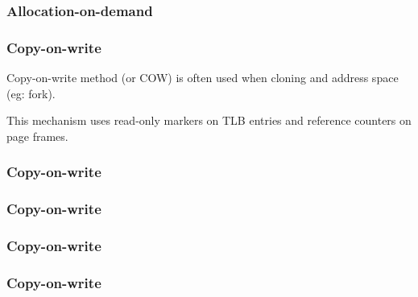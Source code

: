 
\begin{frame}
  \frametitle{Allocation-on-demand}

  \begin{center}
  \end{center}

\end{frame}


\begin{frame}
  \frametitle{Copy-on-write}

  Copy-on-write method (or COW) is often used when cloning and address
  space (eg: fork).

  \-

  This mechanism uses read-only markers on TLB entries and reference
  counters on page frames.

\end{frame}


\begin{frame}
  \frametitle{Copy-on-write}

  \begin{center}
  \end{center}

\end{frame}


\begin{frame}
  \frametitle{Copy-on-write}

  \begin{center}
  \end{center}

\end{frame}


\begin{frame}
  \frametitle{Copy-on-write}

  \begin{center}
  \end{center}

\end{frame}


\begin{frame}
  \frametitle{Copy-on-write}

  \begin{center}
  \end{center}

\end{frame}

